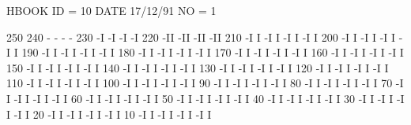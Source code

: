 \begin{Listing}
 HBOOK     ID =        10                                        DATE  17/12/91              NO =   1
 
      250
      240                              -                        -                        -                        -
      230                             -I                       -I                       -I                       -I
      220                            -II                      -II                      -II                      -II
      210                           -I I                     -I I                     -I I                     -I I
      200                          -I  I                    -I  I                    -I  I                    -I  I
      190                         -I   I                   -I   I                   -I   I                   -I   I
      180                        -I    I                  -I    I                  -I    I                  -I    I
      170                       -I     I                 -I     I                 -I     I                 -I     I
      160                      -I      I                -I      I                -I      I                -I      I
      150                     -I       I               -I       I               -I       I               -I       I
      140                    -I        I              -I        I              -I        I              -I        I
      130                   -I         I             -I         I             -I         I             -I         I
      120                  -I          I            -I          I            -I          I            -I          I
      110                 -I           I           -I           I           -I           I           -I           I
      100                -I            I          -I            I          -I            I          -I            I
       90               -I             I         -I             I         -I             I         -I             I
       80              -I              I        -I              I        -I              I        -I              I
       70             -I               I       -I               I       -I               I       -I               I
       60            -I                I      -I                I      -I                I      -I                I
       50           -I                 I     -I                 I     -I                 I     -I                 I
       40          -I                  I    -I                  I    -I                  I    -I                  I
       30         -I                   I   -I                   I   -I                   I   -I                   I
       20        -I                    I  -I                    I  -I                    I  -I                    I
       10       -I                     I -I                     I -I                     I -I                     I
 

\end{Listing}
